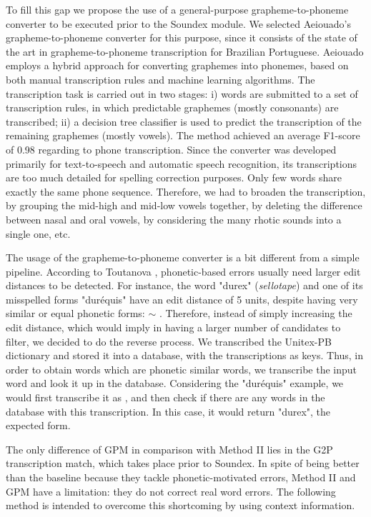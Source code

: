 To fill this gap we propose the use of a general-purpose grapheme-to-phoneme converter to be executed prior to the Soundex module. We selected Aeiouado's grapheme-to-phoneme converter \cite{Mendonca2014} 
for this purpose, since it consists of the state of the art in grapheme-to-phoneme transcription for Brazilian Portuguese. 
Aeiouado employs a hybrid approach for converting graphemes into phonemes, based on both manual transcription rules and machine learning algorithms. The transcription task is carried out in two stages: i) words are submitted to a set of transcription rules, in which predictable graphemes (mostly consonants) are transcribed; ii) a decision tree classifier is used to predict the transcription of the remaining graphemes (mostly vowels). The method achieved an average F1-score of 0.98 regarding to phone transcription. 
Since the converter was developed primarily for text-to-speech and automatic speech recognition, its transcriptions are too much detailed for spelling correction purposes. Only few words share exactly the same phone sequence. Therefore, we had to broaden the transcription, by grouping the mid-high and mid-low vowels together, by deleting the difference between nasal and oral vowels, by considering the many rhotic sounds into a single one, etc.

The usage of the grapheme-to-phoneme converter is a bit different from a simple pipeline. According to Toutanova \cite{Toutanova2002}, phonetic-based errors usually need larger edit distances to be detected. For instance, the word "durex" (\emph{sellotape}) and one of its misspelled forms "dur\'equis" have an edit distance of 5 units, despite having very similar or equal phonetic forms: \textipa{[du'rEks]} $\sim$ \textipa{[du'rEkIs]}. Therefore, instead of simply increasing the edit distance, which would imply in having a larger number of candidates to filter, we decided to do the reverse process. We transcribed the Unitex-PB dictionary and stored it into a database, with the transcriptions as keys. Thus, in order to obtain words which are phonetic similar words, we transcribe the input word and look it up in the database. Considering the "dur\'equis" example, we would first transcribe it as \textipa{[du'rE.kIs]}, and then check if there are any words in the database with this transcription. In this case, it would return "durex", the expected form.

The only difference of GPM in comparison with Method II lies in the G2P transcription match, which takes place prior to Soundex.
In spite of being better than the baseline because they tackle phonetic-motivated errors, Method II and GPM have a limitation: they do not correct real word errors. The following method is intended to overcome this shortcoming by using context information.


